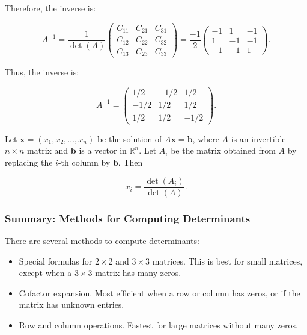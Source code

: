 \documentclass[a4paper,12pt]{article}
\begin{document}
Therefore, the inverse is:

\[
A^{-1} = \frac{1}{\det(A)} \begin{pmatrix} C_{11} & C_{21} & C_{31} \\ C_{12} & C_{22} & C_{32} \\ C_{13} & C_{23} & C_{33} \end{pmatrix} = \frac{-1}{2} \begin{pmatrix} -1 & 1 & -1 \\ 1 & -1 & -1 \\ -1 & -1 & 1 \end{pmatrix}.
\]

Thus, the inverse is:

\[
A^{-1} = \begin{pmatrix} 1/2 & -1/2 & 1/2 \\ -1/2 & 1/2 & 1/2 \\ 1/2 & 1/2 & -1/2 \end{pmatrix}.
\]
\begin{tcolorbox}[title=Theorem: Cramer's rule,colframe=blue!70!black, colback=blue!5!white]
Let \( \mathbf{x} = (x_1, x_2, \dots, x_n) \) be the solution of \( A \mathbf{x} = \mathbf{b} \), where \( A \) is an invertible \( n \times n \) matrix and \( \mathbf{b} \) is a vector in \( \mathbb{R}^n \). Let \( A_i \) be the matrix obtained from \( A \) by replacing the \( i \)-th column by \( \mathbf{b} \). Then

\[
x_i = \frac{\det(A_i)}{\det(A)}.
\]

\end{tcolorbox}
\subsubsection{Summary: Methods for Computing Determinants}

There are several methods to compute determinants:

\begin{itemize}
    \item Special formulas for \( 2 \times 2 \) and \( 3 \times 3 \) matrices. This is best for small matrices, except when a \( 3 \times 3 \) matrix has many zeros.
    \item Cofactor expansion. Most efficient when a row or column has zeros, or if the matrix has unknown entries.
    \item Row and column operations. Fastest for large matrices without many zeros.
\end{itemize}
\end{document}
